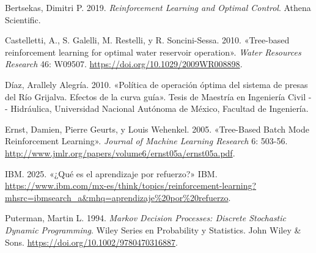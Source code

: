 \documentclass[
  spanish,
  letterpaper,
]{scrreprt}
\newlength{\cslhangindent}
\newenvironment{CSLReferences}[2] %
 {\begin{list}{}{%
  \setlength{\itemindent}{0pt}
  \setlength{\leftmargin}{0pt}
  \setlength{\parsep}{0pt}
  \ifodd #1
   \setlength{\leftmargin}{\cslhangindent}
   \setlength{\itemindent}{-1\cslhangindent}
  \fi
  \setlength{\itemsep}{#2\baselineskip}}}
 {\end{list}}
\theoremstyle{definition}
\theoremstyle{remark}
\begin{document}
\protect{}\label{refs}
\begin{CSLReferences}{1}{1}
Bertsekas, Dimitri P. 2019. \emph{Reinforcement Learning and Optimal
Control}. Athena Scientific.

Castelletti, A., S. Galelli, M. Restelli, y R. Soncini-Sessa. 2010.
{«Tree-based reinforcement learning for optimal water reservoir
operation»}. \emph{Water Resources Research} 46: W09507.
\url{https://doi.org/10.1029/2009WR008898}.

Díaz, Arallely Alegría. 2010. {«Política de operación óptima del sistema
de presas del Río Grijalva. Efectos de la curva guía»}. Tesis de
Maestría en Ingeniería Civil -\/- Hidráulica, Universidad Nacional
Autónoma de México, Facultad de Ingeniería.

Ernst, Damien, Pierre Geurts, y Louis Wehenkel. 2005. {«Tree-Based Batch
Mode Reinforcement Learning»}. \emph{Journal of Machine Learning
Research} 6: 503-56.
\url{http://www.jmlr.org/papers/volume6/ernst05a/ernst05a.pdf}.

IBM. 2025. {«¿Qué es el aprendizaje por refuerzo?»} IBM.
\url{https://www.ibm.com/mx-es/think/topics/reinforcement-learning?mhsrc=ibmsearch_a&mhq=aprendizaje\%20por\%20refuerzo}.

Puterman, Martin L. 1994. \emph{Markov Decision Processes: Discrete
Stochastic Dynamic Programming}. Wiley Series en Probability y
Statistics. John Wiley \& Sons.
\url{https://doi.org/10.1002/9780470316887}.

\end{CSLReferences}
\end{document}
